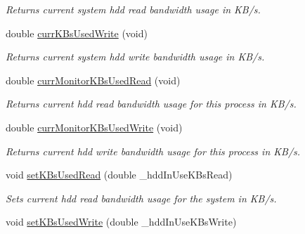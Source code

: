 \begin{DoxyCompactItemize}
\begin{DoxyCompactList}\small\item\em Returns current system hdd read bandwidth usage in K\+B/s. \end{DoxyCompactList}\item 
double \hyperlink{classHddState_a015826def238b010da1413939ff3ea1e}{curr\+K\+Bs\+Used\+Write} (void)\hypertarget{classHddState_a015826def238b010da1413939ff3ea1e}{}\label{classHddState_a015826def238b010da1413939ff3ea1e}

\begin{DoxyCompactList}\small\item\em Returns current system hdd write bandwidth usage in K\+B/s. \end{DoxyCompactList}\item 
double \hyperlink{classHddState_ab0b8b045d72b8bd8aa1c68dc845f5350}{curr\+Monitor\+K\+Bs\+Used\+Read} (void)\hypertarget{classHddState_ab0b8b045d72b8bd8aa1c68dc845f5350}{}\label{classHddState_ab0b8b045d72b8bd8aa1c68dc845f5350}

\begin{DoxyCompactList}\small\item\em Returns current hdd read bandwidth usage for this process in K\+B/s. \end{DoxyCompactList}\item 
double \hyperlink{classHddState_a9fba13f44b261b2cf5a69be3746c6857}{curr\+Monitor\+K\+Bs\+Used\+Write} (void)\hypertarget{classHddState_a9fba13f44b261b2cf5a69be3746c6857}{}\label{classHddState_a9fba13f44b261b2cf5a69be3746c6857}

\begin{DoxyCompactList}\small\item\em Returns current hdd write bandwidth usage for this process in K\+B/s. \end{DoxyCompactList}\item 
void \hyperlink{classHddState_a9f8612decc9f2bccd016289af5f3b682}{set\+K\+Bs\+Used\+Read} (double \+\_\+hdd\+In\+Use\+K\+Bs\+Read)\hypertarget{classHddState_a9f8612decc9f2bccd016289af5f3b682}{}\label{classHddState_a9f8612decc9f2bccd016289af5f3b682}

\begin{DoxyCompactList}\small\item\em Sets current hdd read bandwidth usage for the system in K\+B/s. \end{DoxyCompactList}\item 
void \hyperlink{classHddState_acae5c83d3cf83afa0dbcaf88b30ce67f}{set\+K\+Bs\+Used\+Write} (double \+\_\+hdd\+In\+Use\+K\+Bs\+Write)\hypertarget{classHddState_acae5c83d3cf83afa0dbcaf88b30ce67f}{}\label{classHddState_acae5c83d3cf83afa0dbcaf88b30ce67f}


\end{DoxyCompactItemize}
